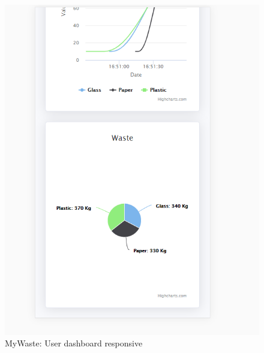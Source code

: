 \documentclass{report}
\begin{document}
\begin{figure}[h!]
    \begin{center}
        \includegraphics[width=1.0\textwidth]{images/userDashboard_resp2.PNG}  \end{center}
    \caption{MyWaste: User dashboard responsive}
    \label{fig: respuserdash2}
\end{figure}
\end{document}
